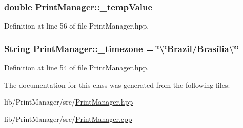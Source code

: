 \subsubsection[{\texorpdfstring{\+\_\+temp\+Value}{_tempValue}}]{\setlength{\rightskip}{0pt plus 5cm}double Print\+Manager\+::\+\_\+temp\+Value\hspace{0.3cm}{\ttfamily [protected]}}\hypertarget{class_print_manager_a550ad6ba340af9c4f689b8e25bd420f3}{}\label{class_print_manager_a550ad6ba340af9c4f689b8e25bd420f3}


Definition at line 56 of file Print\+Manager.\+hpp.

\subsubsection[{\texorpdfstring{\+\_\+timezone}{_timezone}}]{\setlength{\rightskip}{0pt plus 5cm}String Print\+Manager\+::\+\_\+timezone = \char`\"{}\textbackslash{}\char`\"{}Brazil/Brasília\textbackslash{}\char`\"{}\char`\"{}\hspace{0.3cm}{\ttfamily [protected]}}\hypertarget{class_print_manager_ac499e04d25e84c7d7841d24c38a3bd47}{}\label{class_print_manager_ac499e04d25e84c7d7841d24c38a3bd47}


Definition at line 54 of file Print\+Manager.\+hpp.



The documentation for this class was generated from the following files\+:\begin{DoxyCompactItemize}
\item 
lib/\+Print\+Manager/src/\hyperlink{_print_manager_8hpp}{Print\+Manager.\+hpp}\item 
lib/\+Print\+Manager/src/\hyperlink{_print_manager_8cpp}{Print\+Manager.\+cpp}\end{DoxyCompactItemize}
